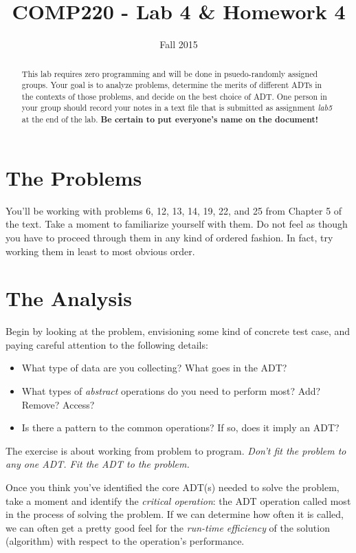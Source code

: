 \documentclass[10pt]{article}
\title{COMP220 - Lab 4 \& Homework 4}
\author{ }
\date{Fall 2015}
\begin{document}
\maketitle

\begin{abstract}
This lab requires zero programming and will be done in psuedo-randomly assigned groups. Your goal is to analyze problems, determine the merits of different ADTs in the contexts of those problems, and decide on the best choice of ADT. One person in your group should record your notes in a text file that is submitted as assignment \textit{lab5} at the end of the lab. \textbf{Be certain to put everyone's name on the document!}
\end{abstract}


\section{The Problems}

You'll be working with problems 6, 12, 13, 14, 19, 22, and 25 from Chapter 5 of the text. Take a moment to familiarize yourself with them. Do not feel as though you have to proceed through them in any kind of ordered fashion. In fact, try working them in least to most obvious order. 

\section{The Analysis}

Begin by looking at the problem, envisioning some kind of concrete test case, and paying careful attention to the following details:
\begin{itemize}
\item What type of data are you collecting? What goes in the ADT? 
\item What types of \textit{abstract} operations do you need to perform most? Add? Remove? Access? 
\item Is there a pattern to the common operations? If so, does it imply an ADT? 
\end{itemize}
The exercise is about working from problem to program. \textit{Don't fit the problem to any one ADT. Fit the ADT to the problem.}

Once you think you've identified the core ADT(s) needed to solve the problem, take a moment and identify the \textit{critical operation}: the ADT operation called most in the process of solving the problem. If we can determine how often it is called, we can often get a pretty good feel for the \textit{run-time efficiency} of the solution (algorithm) with respect to the operation's performance. 
\end{document}
